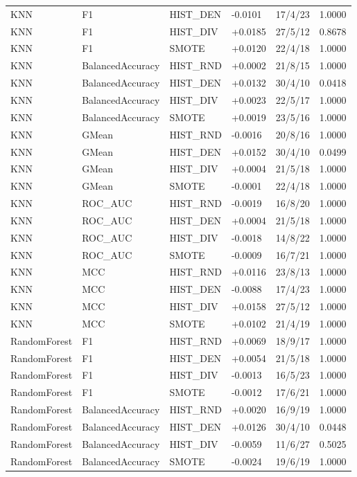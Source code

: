 \documentclass[10pt,a4paper]{article}
\begin{document}
\begin{longtable}{llllrr}
KNN & F1 & HIST\_DEN & -0.0101 & 17/4/23 & 1.0000 \\
KNN & F1 & HIST\_DIV & +0.0185 & 27/5/12 & 0.8678 \\
KNN & F1 & SMOTE & +0.0120 & 22/4/18 & 1.0000 \\
KNN & BalancedAccuracy & HIST\_RND & +0.0002 & 21/8/15 & 1.0000 \\
KNN & BalancedAccuracy & HIST\_DEN & +0.0132 & 30/4/10 & 0.0418 \\
KNN & BalancedAccuracy & HIST\_DIV & +0.0023 & 22/5/17 & 1.0000 \\
KNN & BalancedAccuracy & SMOTE & +0.0019 & 23/5/16 & 1.0000 \\
KNN & GMean & HIST\_RND & -0.0016 & 20/8/16 & 1.0000 \\
KNN & GMean & HIST\_DEN & +0.0152 & 30/4/10 & 0.0499 \\
KNN & GMean & HIST\_DIV & +0.0004 & 21/5/18 & 1.0000 \\
KNN & GMean & SMOTE & -0.0001 & 22/4/18 & 1.0000 \\
KNN & ROC\_AUC & HIST\_RND & -0.0019 & 16/8/20 & 1.0000 \\
KNN & ROC\_AUC & HIST\_DEN & +0.0004 & 21/5/18 & 1.0000 \\
KNN & ROC\_AUC & HIST\_DIV & -0.0018 & 14/8/22 & 1.0000 \\
KNN & ROC\_AUC & SMOTE & -0.0009 & 16/7/21 & 1.0000 \\
KNN & MCC & HIST\_RND & +0.0116 & 23/8/13 & 1.0000 \\
KNN & MCC & HIST\_DEN & -0.0088 & 17/4/23 & 1.0000 \\
KNN & MCC & HIST\_DIV & +0.0158 & 27/5/12 & 1.0000 \\
KNN & MCC & SMOTE & +0.0102 & 21/4/19 & 1.0000 \\
RandomForest & F1 & HIST\_RND & +0.0069 & 18/9/17 & 1.0000 \\
RandomForest & F1 & HIST\_DEN & +0.0054 & 21/5/18 & 1.0000 \\
RandomForest & F1 & HIST\_DIV & -0.0013 & 16/5/23 & 1.0000 \\
RandomForest & F1 & SMOTE & -0.0012 & 17/6/21 & 1.0000 \\
RandomForest & BalancedAccuracy & HIST\_RND & +0.0020 & 16/9/19 & 1.0000 \\
RandomForest & BalancedAccuracy & HIST\_DEN & +0.0126 & 30/4/10 & 0.0448 \\
RandomForest & BalancedAccuracy & HIST\_DIV & -0.0059 & 11/6/27 & 0.5025 \\
RandomForest & BalancedAccuracy & SMOTE & -0.0024 & 19/6/19 & 1.0000 \\

\end{longtable}
\end{document}

